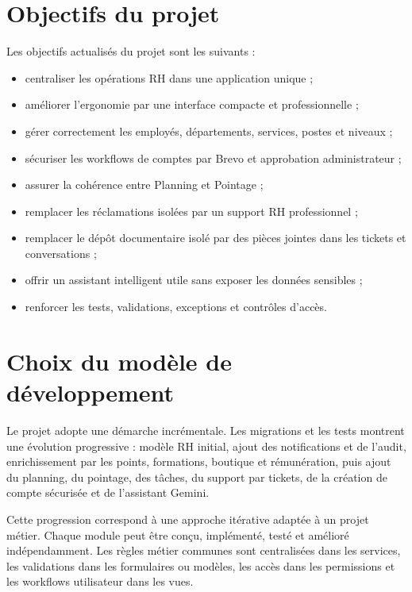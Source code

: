 \documentclass[12pt,a4paper]{report}
\begin{document}
\section{Objectifs du projet}
Les objectifs actualisés du projet sont les suivants :
\begin{itemize}
\item centraliser les opérations RH dans une application unique ;
\item améliorer l'ergonomie par une interface compacte et professionnelle ;
\item gérer correctement les employés, départements, services, postes et niveaux ;
\item sécuriser les workflows de comptes par Brevo et approbation administrateur ;
\item assurer la cohérence entre Planning et Pointage ;
\item remplacer les réclamations isolées par un support RH professionnel ;
\item remplacer le dépôt documentaire isolé par des pièces jointes dans les tickets et conversations ;
\item offrir un assistant intelligent utile sans exposer les données sensibles ;
\item renforcer les tests, validations, exceptions et contrôles d'accès.
\end{itemize}

\section{Choix du modèle de développement}
Le projet adopte une démarche incrémentale. Les migrations et les tests montrent une évolution progressive : modèle RH initial, ajout des notifications et de l'audit, enrichissement par les points, formations, boutique et rémunération, puis ajout du planning, du pointage, des tâches, du support par tickets, de la création de compte sécurisée et de l'assistant Gemini.

Cette progression correspond à une approche itérative adaptée à un projet métier. Chaque module peut être conçu, implémenté, testé et amélioré indépendamment. Les règles métier communes sont centralisées dans les services, les validations dans les formulaires ou modèles, les accès dans les permissions et les workflows utilisateur dans les vues.
\end{document}
